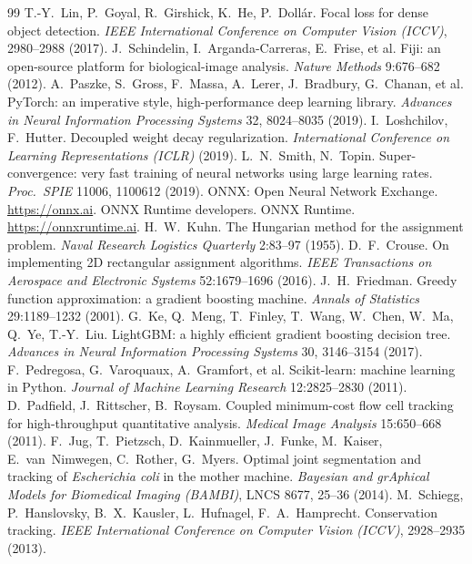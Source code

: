 \documentclass[11pt,a4paper]{article}
\begin{document}
\begin{thebibliography}{99}
 T.-Y.~Lin, P.~Goyal, R.~Girshick, K.~He, P.~Doll\'ar. Focal loss for dense object detection. \emph{IEEE International Conference on Computer Vision (ICCV)}, 2980--2988 (2017).
 J.~Schindelin, I.~Arganda-Carreras, E.~Frise, et al. Fiji: an open-source platform for biological-image analysis. \emph{Nature Methods} 9:676--682 (2012).
 A.~Paszke, S.~Gross, F.~Massa, A.~Lerer, J.~Bradbury, G.~Chanan, et al. PyTorch: an imperative style, high-performance deep learning library. \emph{Advances in Neural Information Processing Systems} 32, 8024--8035 (2019).
 I.~Loshchilov, F.~Hutter. Decoupled weight decay regularization. \emph{International Conference on Learning Representations (ICLR)} (2019).
 L.~N.~Smith, N.~Topin. Super-convergence: very fast training of neural networks using large learning rates. \emph{Proc.\ SPIE} 11006, 1100612 (2019).
 ONNX: Open Neural Network Exchange. \url{https://onnx.ai}.
 ONNX Runtime developers. ONNX Runtime. \url{https://onnxruntime.ai}.
 H.~W.~Kuhn. The Hungarian method for the assignment problem. \emph{Naval Research Logistics Quarterly} 2:83--97 (1955).
 D.~F.~Crouse. On implementing 2D rectangular assignment algorithms. \emph{IEEE Transactions on Aerospace and Electronic Systems} 52:1679--1696 (2016).
 J.~H.~Friedman. Greedy function approximation: a gradient boosting machine. \emph{Annals of Statistics} 29:1189--1232 (2001).
 G.~Ke, Q.~Meng, T.~Finley, T.~Wang, W.~Chen, W.~Ma, Q.~Ye, T.-Y.~Liu. LightGBM: a highly efficient gradient boosting decision tree. \emph{Advances in Neural Information Processing Systems} 30, 3146--3154 (2017).
 F.~Pedregosa, G.~Varoquaux, A.~Gramfort, et al. Scikit-learn: machine learning in Python. \emph{Journal of Machine Learning Research} 12:2825--2830 (2011).
 D.~Padfield, J.~Rittscher, B.~Roysam. Coupled minimum-cost flow cell tracking for high-throughput quantitative analysis. \emph{Medical Image Analysis} 15:650--668 (2011).
 F.~Jug, T.~Pietzsch, D.~Kainmueller, J.~Funke, M.~Kaiser, E.~van~Nimwegen, C.~Rother, G.~Myers. Optimal joint segmentation and tracking of \emph{Escherichia coli} in the mother machine. \emph{Bayesian and grAphical Models for Biomedical Imaging (BAMBI)}, LNCS 8677, 25--36 (2014).
 M.~Schiegg, P.~Hanslovsky, B.~X.~Kausler, L.~Hufnagel, F.~A.~Hamprecht. Conservation tracking. \emph{IEEE International Conference on Computer Vision (ICCV)}, 2928--2935 (2013).

\end{thebibliography}
\end{document}
